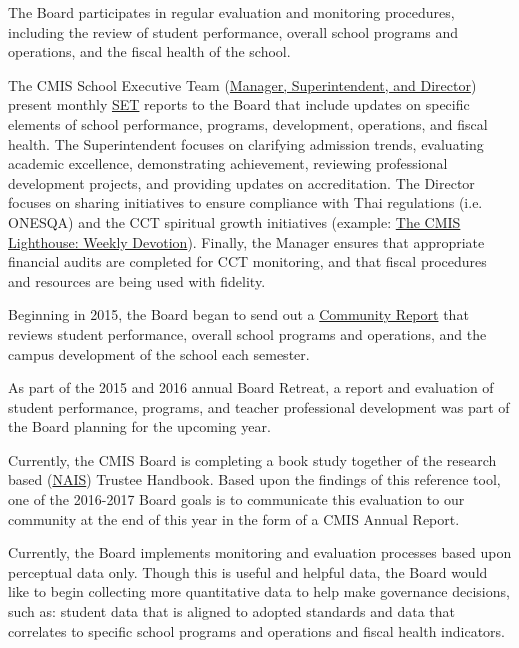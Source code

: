 \begin{findings}
The Board participates in regular evaluation and monitoring procedures, including the review of student performance, overall school programs and operations, and the fiscal health of the school.

The CMIS School Executive Team (\href{https://drive.google.com/a/cmis.ac.th/file/d/0Bwny3HLdIIS7di1mY0xFMnJyWmQzNEhON09EREpvY0JRd0Jv/view?usp=sharing}{Manager, Superintendent, and Director}) present monthly \href{https://docs.google.com/document/d/1gz3SiCiPUMU9n-JgGqzGQhgl0r0qAdpSfQPtBK-rwyI/edit}{SET} reports to the Board that include updates on specific elements of school performance, programs, development, operations, and fiscal health. The Superintendent focuses on clarifying admission trends, evaluating academic excellence, demonstrating achievement, reviewing professional development projects, and providing updates on accreditation. The Director focuses on sharing initiatives to ensure compliance with Thai regulations (i.e. ONESQA) and the CCT spiritual growth initiatives (example: \href{http://blogs.cmis.ac.th/spiritual-life/2017/02/03/the-lords-prayer-weekly-devotional-60217-100217/}{The CMIS Lighthouse: Weekly Devotion}). Finally, the Manager ensures that appropriate financial audits are completed for CCT monitoring, and that fiscal procedures and resources are being used with fidelity. 

Beginning in 2015, the Board began to send out a \href{https://docs.google.com/a/cmis.ac.th/document/d/16DVRIWxzKBgzVMqk8coHlO97SFWthAA_DEx4z6WSHQs/edit?usp=sharing}{Community Report} that reviews student performance, overall school programs and operations, and the campus development of the school each semester.  

As part of the 2015 and 2016 annual Board Retreat, a report and evaluation of student performance, programs, and teacher professional development was part of the Board planning for the upcoming year. 

Currently, the CMIS Board is completing a book study together of the research based (\href{http://www.nais.org/Articles/Pages/NAIS-Trustee-Handbook-Resources.aspx}{NAIS}) Trustee Handbook.  Based upon the findings of this reference tool, one of the 2016-2017 Board goals is to communicate this evaluation to our community at the end of this year in the form of a CMIS Annual Report.


Currently, the Board implements monitoring and evaluation processes based upon perceptual data only. Though this is useful and helpful data, the Board would like to begin collecting more quantitative data to help make governance decisions, such as: student data that is aligned to adopted standards and data that correlates to specific school programs and operations and fiscal health indicators. 
\end{findings}

